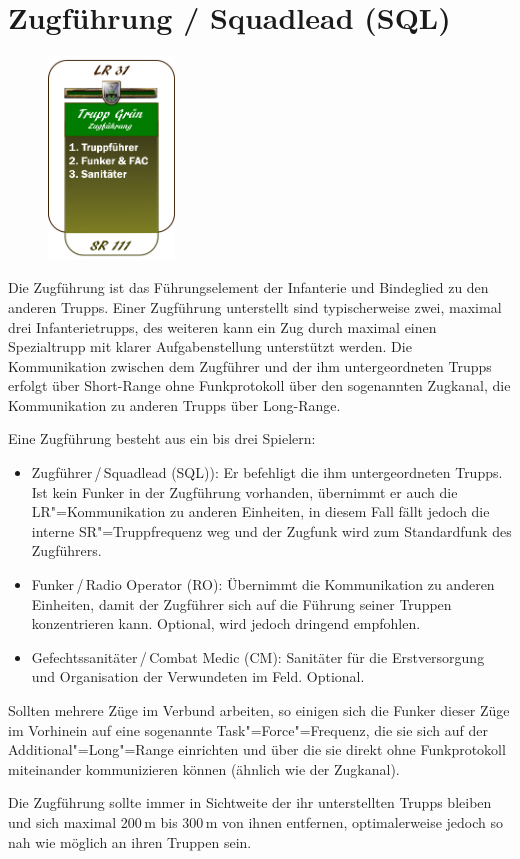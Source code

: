 \section{Zugführung / Squadlead (SQL)}
\begin{figure}
	\centering 
	\vspace{-20pt}
	\includegraphics[width=0.3\textwidth]{../img/truppenordnung/zugfuehrung/zugfuehrung}
	\vspace{-50pt}
\end{figure}
Die Zugführung ist das Führungselement der Infanterie und Bindeglied zu den anderen Trupps. Einer Zugführung unterstellt sind typischerweise zwei, maximal drei Infanterietrupps, des weiteren kann ein Zug durch maximal einen Spezialtrupp mit klarer Aufgabenstellung unterstützt werden. Die Kommunikation zwischen dem Zugführer und der ihm untergeordneten Trupps erfolgt über Short-Range ohne Funkprotokoll über den sogenannten Zugkanal, die Kommunikation zu anderen Trupps über Long-Range.
\par\bigskip\bigskip
Eine Zugführung besteht aus ein bis drei Spielern:
\begin{itemize}
	\item Zugführer\,/\,Squadlead (SQL)): Er befehligt die ihm untergeordneten Trupps. Ist kein Funker in der Zugführung vorhanden, übernimmt er auch die LR"=Kommunikation zu anderen Einheiten, in diesem Fall fällt jedoch die interne SR"=Truppfrequenz weg und der Zugfunk wird zum Standardfunk des Zugführers.
	\item Funker\,/\,Radio Operator (RO): Übernimmt die Kommunikation zu anderen Einheiten, damit der Zugführer sich auf die Führung seiner Truppen konzentrieren kann. Optional, wird jedoch dringend empfohlen.
	\item Gefechtssanitäter\,/\,Combat Medic (CM): Sanitäter für die Erstversorgung und Organisation der Verwundeten im Feld. Optional.
\end{itemize}
Sollten mehrere Züge im Verbund arbeiten, so einigen sich die Funker dieser Züge im Vorhinein auf eine sogenannte Task"=Force"=Frequenz, die sie sich auf der Additional"=Long"=Range einrichten und über die sie direkt ohne Funkprotokoll miteinander kommunizieren können (ähnlich wie der Zugkanal).\par
Die Zugführung sollte immer in Sichtweite der ihr unterstellten Trupps bleiben und sich maximal 200\,m bis 300\,m von ihnen entfernen, optimalerweise jedoch so nah wie möglich an ihren Truppen sein.